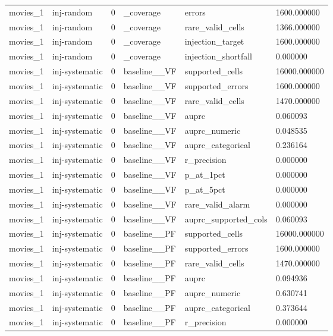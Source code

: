 \begin{tabular}{llllll}
movies\_1 & inj-random & 0 & \_coverage & errors & 1600.000000 \\
movies\_1 & inj-random & 0 & \_coverage & rare\_valid\_cells & 1366.000000 \\
movies\_1 & inj-random & 0 & \_coverage & injection\_target & 1600.000000 \\
movies\_1 & inj-random & 0 & \_coverage & injection\_shortfall & 0.000000 \\
movies\_1 & inj-systematic & 0 & baseline\_\_VF & supported\_cells & 16000.000000 \\
movies\_1 & inj-systematic & 0 & baseline\_\_VF & supported\_errors & 1600.000000 \\
movies\_1 & inj-systematic & 0 & baseline\_\_VF & rare\_valid\_cells & 1470.000000 \\
movies\_1 & inj-systematic & 0 & baseline\_\_VF & auprc & 0.060093 \\
movies\_1 & inj-systematic & 0 & baseline\_\_VF & auprc\_numeric & 0.048535 \\
movies\_1 & inj-systematic & 0 & baseline\_\_VF & auprc\_categorical & 0.236164 \\
movies\_1 & inj-systematic & 0 & baseline\_\_VF & r\_precision & 0.000000 \\
movies\_1 & inj-systematic & 0 & baseline\_\_VF & p\_at\_1pct & 0.000000 \\
movies\_1 & inj-systematic & 0 & baseline\_\_VF & p\_at\_5pct & 0.000000 \\
movies\_1 & inj-systematic & 0 & baseline\_\_VF & rare\_valid\_alarm & 0.000000 \\
movies\_1 & inj-systematic & 0 & baseline\_\_VF & auprc\_supported\_cols & 0.060093 \\
movies\_1 & inj-systematic & 0 & baseline\_\_PF & supported\_cells & 16000.000000 \\
movies\_1 & inj-systematic & 0 & baseline\_\_PF & supported\_errors & 1600.000000 \\
movies\_1 & inj-systematic & 0 & baseline\_\_PF & rare\_valid\_cells & 1470.000000 \\
movies\_1 & inj-systematic & 0 & baseline\_\_PF & auprc & 0.094936 \\
movies\_1 & inj-systematic & 0 & baseline\_\_PF & auprc\_numeric & 0.630741 \\
movies\_1 & inj-systematic & 0 & baseline\_\_PF & auprc\_categorical & 0.373644 \\
movies\_1 & inj-systematic & 0 & baseline\_\_PF & r\_precision & 0.000000 \\

\end{tabular}
